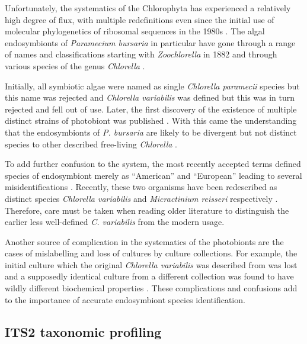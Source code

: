 
Unfortunately, the systematics of the Chlorophyta has experienced a relatively
high degree of flux, with multiple redefinitions even since the initial 
use of molecular phylogenetics of ribosomal sequences \citep{Hori1985,Gunderson1987}
in the 1980s \citep{Leliaert2012,Hoshina2010}.  The algal endosymbionts of
\textit{Paramecium bursaria} in particular have gone through a range of 
names and classifications starting with \textit{Zoochlorella} in 1882 and
through various species of the genus \textit{Chlorella} \citep{Hoshina2010}.

Initially, all symbiotic algae were named as single \textit{Chlorella paramecii}
species but this name was rejected and \textit{Chlorella variabilis} 
was defined \citep{shihira1965chlorella} but this was in turn rejected and fell out of use.
Later, the first discovery of the existence of multiple distinct strains of photobiont was published \citep{Douglas1986}.
With this came the understanding that the endosymbionts of \textit{P. bursaria}
are likely to be divergent but not distinct species to other described
free-living \textit{Chlorella} \citep{Hoshina2010}.

To add further confusion to the system, the most recently
accepted terms defined species of endosymbiont merely 
as ``American'' and ``European'' leading to several
misidentifications \citep{Kodama2007,Hoshina2010}.
Recently, these two organisms have been redescribed as
distinct species \textit{Chlorella variabilis} and
\textit{Micractinium reisseri} respectively \citep{Hoshina2010}.
Therefore, care must be taken when reading older literature
to distinguish the earlier less well-defined \textit{C. variabilis}
from the modern usage.

Another source of complication in the systematics of the photobionts 
are the cases of mislabelling and loss of cultures
by culture collections. For example, the initial culture
which the original \textit{Chlorella variabilis} was described from was lost
and a supposedly identical culture from a different collection
was found to have wildly different biochemical properties \citep{Hoshina2010}.
These complications and confusions add to the importance
of accurate endosymbiont species identification. 

\subsection{ITS2 taxonomic profiling}

